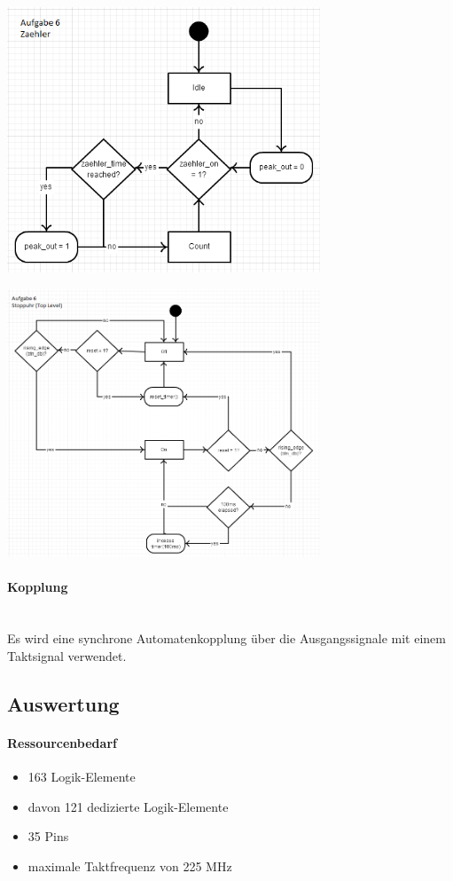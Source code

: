 		\includegraphics[width=0.7\textwidth]{resources/06-Zaehler.png}

		\includegraphics[width=0.7\textwidth]{resources/06-Stoppuhr.png}
 
	\paragraph{Kopplung} \hfill\\
	Es wird eine synchrone Automatenkopplung über die Ausgangssignale mit einem Taktsignal verwendet.
\subsection{Auswertung}
	\paragraph{Ressourcenbedarf}
	\begin{itemize} 
	\item 163 Logik-Elemente
	\item davon 121 dedizierte Logik-Elemente
	\item 35 Pins 
	\item maximale Taktfrequenz von 225 MHz
	\end{itemize}
